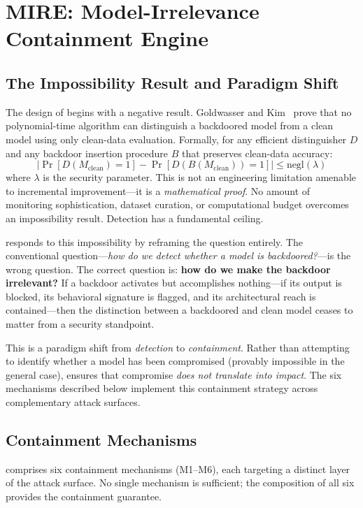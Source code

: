 \section{MIRE: Model-Irrelevance Containment Engine}
\label{sec:mire}

\subsection{The Impossibility Result and Paradigm Shift}

The design of \mire begins with a negative result. Goldwasser and
Kim~\cite{goldwasser2022} prove that no polynomial-time algorithm can
distinguish a backdoored model from a clean model using only clean-data
evaluation. Formally, for any efficient distinguisher $D$ and any backdoor
insertion procedure $B$ that preserves clean-data accuracy:
\[
  \left|\Pr[D(M_{\text{clean}}) = 1] - \Pr[D(B(M_{\text{clean}})) = 1]\right|
  \leq \text{negl}(\lambda)
\]
where $\lambda$ is the security parameter. This is not an engineering
limitation amenable to incremental improvement---it is a \emph{mathematical
proof}. No amount of monitoring sophistication, dataset curation, or
computational budget overcomes an impossibility result. Detection has a
fundamental ceiling.

\mire responds to this impossibility by reframing the question entirely.
The conventional question---\emph{how do we detect whether a model is
backdoored?}---is the wrong question. The correct question is:
\textbf{how do we make the backdoor irrelevant?} If a backdoor activates
but accomplishes nothing---if its output is blocked, its behavioral
signature is flagged, and its architectural reach is contained---then the
distinction between a backdoored and clean model ceases to matter from a
security standpoint.

This is a paradigm shift from \emph{detection} to \emph{containment}.
Rather than attempting to identify whether a model has been compromised
(provably impossible in the general case), \mire ensures that compromise
\emph{does not translate into impact}. The six mechanisms described below
implement this containment strategy across complementary attack surfaces.

\subsection{Containment Mechanisms}

\mire comprises six containment mechanisms (M1--M6), each targeting a
distinct layer of the attack surface. No single mechanism is sufficient;
the composition of all six provides the containment guarantee.

